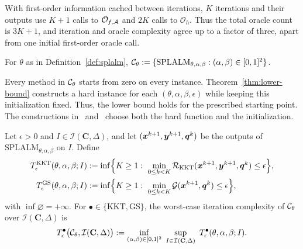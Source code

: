 With first-order information cached between iterations, \(K\) iterations and
their outputs use \(K+1\) calls to \(\mathcal O_{f,\mathcal{A}}\) and \(2K\) calls to
\(\mathcal O_h\). Thus the total oracle count is \(3K+1\), and iteration
and oracle complexity agree up to a factor of three, apart from one initial
first-order oracle call.

\begin{definition}
\label{def:algorithm-family}
For \(\theta\) as in Definition~\ref{def:splalm},
\(\mathcal{C}_\theta:=\{\mathrm{SPLALM}_{\theta,\alpha,\beta}:(\alpha,\beta)\in[0,1]^2\}\).
\end{definition}

\begin{remark}[Initialization]
\label{rem:lb-initialization}
Every method in \(\mathcal{C}_\theta\) starts from zero on every instance.
Theorem~\ref{thm:lower-bound} constructs a hard instance for each
\((\theta,\alpha,\beta,\epsilon)\) while keeping this initialization fixed.
Thus, the lower bound holds for the prescribed starting point.
The constructions in~\cite[Section~5.1.1]{li2026smoothing}
and~\cite[Appendix~C.1]{mahdavinia2022tight} choose both the hard function
and the initialization.
\end{remark}

\begin{definition}
\label{def:complexity-measure}
Let \(\epsilon>0\) and \(I\in\mathcal I(\mathbf C,\Delta)\), and let
\((\bm{x}^{k+1},\bm{y}^{k+1},\bm{q}^k)\) be the outputs of
\(\mathrm{SPLALM}_{\theta,\alpha,\beta}\) on \(I\). Define
\[
\begin{aligned}
    T^{\mathrm{KKT}}_\epsilon(\theta,\alpha,\beta;I)
    &:=\inf\Bigl\{K\ge1:\ \min_{0\le k<K}
        \mathcal R_{\mathrm{KKT}}(\bm{x}^{k+1},\bm{y}^{k+1},\bm{q}^k)\le\epsilon\Bigr\},\\
    T^{\mathrm{GS}}_\epsilon(\theta,\alpha,\beta;I)
    &:=\inf\Bigl\{K\ge1:\ \min_{0\le k<K}
        \mathcal{G}(\bm{x}^{k+1},\bm{q}^k)\le\epsilon\Bigr\},
\end{aligned}
\]
with \(\inf\varnothing=+\infty\). For \(\bullet\in\{\mathrm{KKT},\mathrm{GS}\}\),
the worst-case iteration complexity of \(\mathcal{C}_\theta\) over
\(\mathcal I(\mathbf C,\Delta)\) is
\[
    T^{\bullet}_\epsilon\bigl(\mathcal{C}_\theta,\mathcal I(\mathbf C,\Delta)\bigr)
    :=\inf_{(\alpha,\beta)\in[0,1]^2}\
    \sup_{I\in\mathcal I(\mathbf C,\Delta)}\
    T^{\bullet}_\epsilon(\theta,\alpha,\beta;I).
\]
\end{definition}

